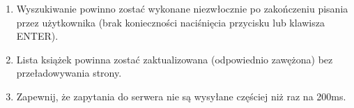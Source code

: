 \documentclass[12pt]{article}
\begin{document}
\begin{enumerate}
\begin{enumerate}
				\item Wyszukiwanie powinno zostać wykonane niezwłocznie po zakończeniu pisania przez użytkownika (brak konieczności naciśnięcia przycisku lub klawisza ENTER).

				\item Lista książek powinna zostać zaktualizowana (odpowiednio zawężona) bez przeładowywania strony.

				\item Zapewnij, że zapytania do serwera nie są wysyłane częściej niż raz na 200ms.
			\end{enumerate}
    \end{enumerate}
\end{document}

